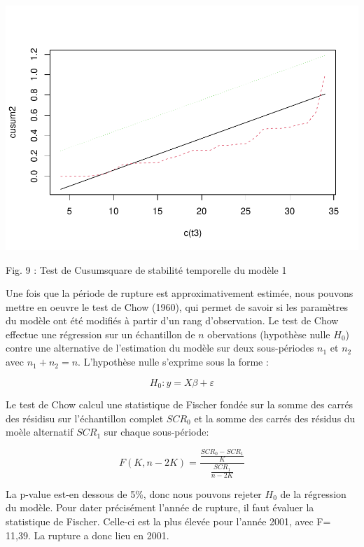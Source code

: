 \documentclass[
]{article}
\begin{document}
\begin{center}\includegraphics[width=0.7\linewidth,height=0.7\textheight]{Projet_econometrie_II_files/figure-latex/unnamed-chunk-8-1} \end{center}

Fig. 9 : Test de Cusumsquare de stabilité temporelle du modèle 1

Une fois que la période de rupture est approximativement estimée, nous
pouvons mettre en oeuvre le test de Chow (1960), qui permet de savoir si
les paramètres du modèle ont été modifiés à partir d'un rang
d'observation. Le test de Chow effectue une régression sur un
échantillon de \(n\) obervations (hypothèse nulle \(H_0\)) contre une
alternative de l'estimation du modèle sur deux sous-périodes \(n_1\) et
\(n_2\) avec \(n_1 + n_2 = n\). L'hypothèse nulle s'exprime sous la
forme :

\begin{equation}
\label{eq:H0chow}
H_0 : y = X\beta + \varepsilon 
\end{equation}

Le test de Chow calcul une statistique de Fischer fondée sur la somme
des carrés des résidisu sur l'échantillon complet \(SCR_0\) et la somme
des carrés des résidus du moèle alternatif \(SCR_1\) sur chaque
sous-période:

\begin{equation}
\label{eq:statF}
F(K,n-2K) = \frac{\frac{SCR_0 - SCR_1}{K}}{\frac{SCR_1}{n - 2K}}
\end{equation}

La p-value est-en dessous de 5\%, donc nous pouvons rejeter \(H_0\) de
la régression du modèle. Pour dater précisément l'année de rupture, il
faut évaluer la statistique de Fischer. Celle-ci est la plus élevée pour
l'année 2001, avec F= 11,39. La rupture a donc lieu en 2001.
\end{document}
